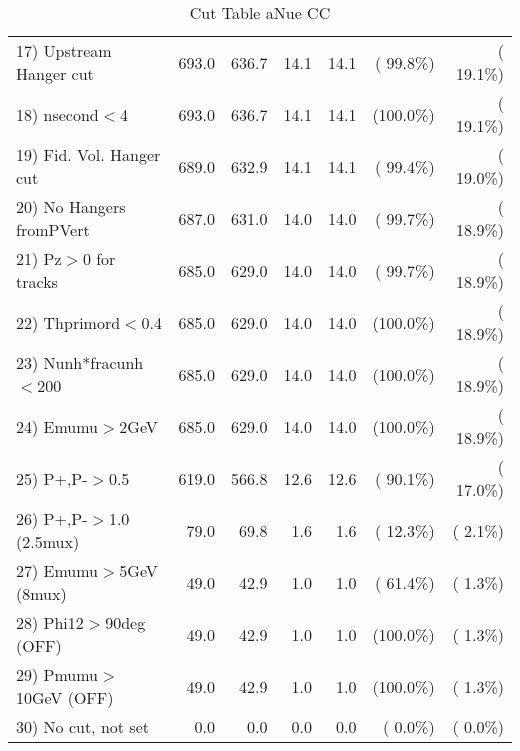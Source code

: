 \begin{table}[h!]
\begin{tabular}{||l||r|r|r|r|r|r||}
 17) Upstream Hanger cut  &        693.0 &        636.7 &         14.1 &         14.1 & ( 99.8\%) & ( 19.1\%) \\
 18) nsecond$<$4          &        693.0 &        636.7 &         14.1 &         14.1 & (100.0\%) & ( 19.1\%) \\
 19) Fid. Vol. Hanger cut &        689.0 &        632.9 &         14.1 &         14.1 & ( 99.4\%) & ( 19.0\%) \\
 20) No Hangers fromPVert &        687.0 &        631.0 &         14.0 &         14.0 & ( 99.7\%) & ( 18.9\%) \\
 21) Pz$>$0 for tracks    &        685.0 &        629.0 &         14.0 &         14.0 & ( 99.7\%) & ( 18.9\%) \\
 22) Thprimord$<$0.4      &        685.0 &        629.0 &         14.0 &         14.0 & (100.0\%) & ( 18.9\%) \\
 23) Nunh*fracunh$<$200   &        685.0 &        629.0 &         14.0 &         14.0 & (100.0\%) & ( 18.9\%) \\
 24) Emumu$>$2GeV         &        685.0 &        629.0 &         14.0 &         14.0 & (100.0\%) & ( 18.9\%) \\
 25) P+,P-$>$0.5          &        619.0 &        566.8 &         12.6 &         12.6 & ( 90.1\%) & ( 17.0\%) \\
 26) P+,P-$>$1.0 (2.5mux) &         79.0 &         69.8 &          1.6 &          1.6 & ( 12.3\%) & (  2.1\%) \\
 27) Emumu$>$5GeV  (8mux) &         49.0 &         42.9 &          1.0 &          1.0 & ( 61.4\%) & (  1.3\%) \\
 28) Phi12$>$90deg  (OFF) &         49.0 &         42.9 &          1.0 &          1.0 & (100.0\%) & (  1.3\%) \\
 29) Pmumu$>$10GeV  (OFF) &         49.0 &         42.9 &          1.0 &          1.0 & (100.0\%) & (  1.3\%) \\
 30) No cut, not set      &          0.0 &          0.0 &          0.0 &          0.0 & (  0.0\%) & (  0.0\%) \\
 \hline
 \hline
 \end{tabular}
 \caption{Cut Table  aNue CC  }
 \label{tab-cutheavy_neutrino_3.000}
 \end{table}
